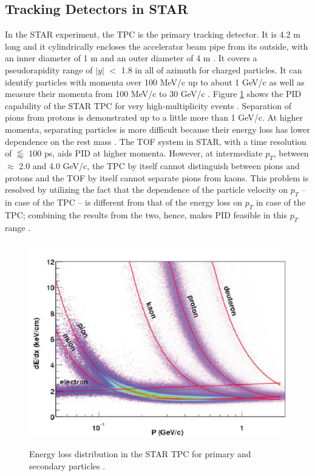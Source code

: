 \subsection{Tracking Detectors in STAR}\label{subsec:tracking_STAR}
In the STAR experiment, the TPC is the primary tracking detector. It is 4.2 m long and it cylindrically encloses the accelerator beam pipe from its outside, with an inner diameter of 1 m and an outer diameter of 4 m \cite{phdthesisnattrass}. It covers a pseudorapidity range of $|y|$ $<$ 1.8 in all of azimuth for charged particles. It can identify particles with momenta over 100 MeV/c up to about 1 GeV/c as well as measure their momenta from 100 MeV/c to 30 GeV/c \cite{Anderson:2003ur}. Figure \ref{fig:STAR_PID} shows the PID capability of the STAR TPC for very high-multiplicity events \cite{0034-4885-73-11-116201}. Separation of pions from protons is demonstrated up to a little more than 1 GeV/c. At higher momenta, separating particles is more difficult because their energy loss has lower dependence on the rest mass \cite{Anderson:2003ur}. The TOF system in STAR, with a time resolution of $\lessapprox$ 100 ps, aids PID at higher momenta. However, at intermediate $p_{T}$, between $\approx$ 2.0 and 4.0 GeV/c, the TPC by itself cannot distinguish between pions and protons and the TOF by itself cannot separate pions from kaons. This problem is resolved by utilizing the fact that the dependence of the particle velocity on $p_{T}$ -- in case of the TPC -- is different from that of the energy loss on $p_{T}$ in case of the TPC; combining the results from the two, hence, makes PID feasible in this $p_{T}$ range \cite{Shao:2005iu}.
\begin{figure}[h]
  \centering
  \includegraphics[width=5.5in]{figures/TPCdEdxMod.eps}\\
  \caption{Energy loss distribution in the STAR TPC for primary and secondary particles \cite{Anderson:2003ur}.}\label{fig:STAR_PID} %
\end{figure}
